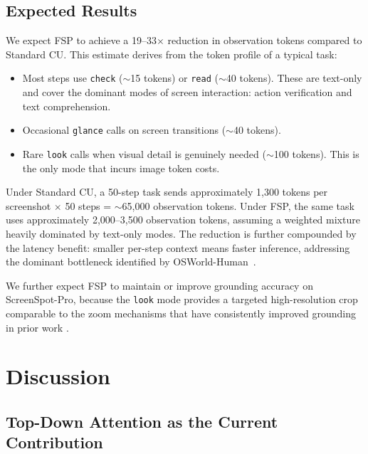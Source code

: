 \documentclass[11pt,a4paper]{article}
\begin{document}
\subsection{Expected Results}

We expect FSP to achieve a 19--33$\times$ reduction in observation tokens compared to Standard CU. This estimate derives from the token profile of a typical task:

\begin{itemize}
    \item Most steps use \texttt{check} ($\sim$15 tokens) or \texttt{read} ($\sim$40 tokens). These are text-only and cover the dominant modes of screen interaction: action verification and text comprehension.
    \item Occasional \texttt{glance} calls on screen transitions ($\sim$40 tokens).
    \item Rare \texttt{look} calls when visual detail is genuinely needed ($\sim$100 tokens). This is the only mode that incurs image token costs.
\end{itemize}

Under Standard CU, a 50-step task sends approximately 1,300 tokens per screenshot $\times$ 50 steps = $\sim$65,000 observation tokens. Under FSP, the same task uses approximately 2,000--3,500 observation tokens, assuming a weighted mixture heavily dominated by text-only modes. The reduction is further compounded by the latency benefit: smaller per-step context means faster inference, addressing the dominant bottleneck identified by OSWorld-Human~\cite{osworld-human}.

We further expect FSP to maintain or improve grounding accuracy on ScreenSpot-Pro, because the \texttt{look} mode provides a targeted high-resolution crop comparable to the zoom mechanisms that have consistently improved grounding in prior work \cite{regionfocus, zoomclick, adazoom-gui, gui-eyes}.



\section{Discussion}
\label{sec:discussion}

\subsection{Top-Down Attention as the Current Contribution}
\end{document}
